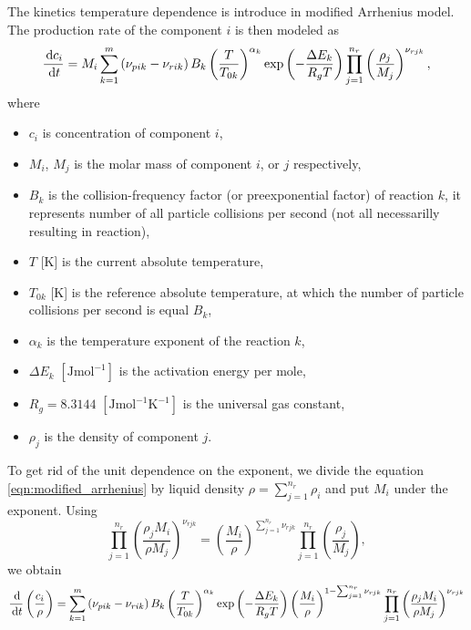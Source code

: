 The kinetics temperature dependence is introduce in modified Arrhenius model.
The production rate of the component $i$ is then modeled as
\begin{equation} \label{eqn:modified_arrhenius}
  \frac{\d c_i}{\d t} = M_i \sum\limits_{k=1}^{m}\left( \nu_{pik}-\nu_{rik} \right) 
  B_k \left(\frac{T}{T_{0k}}\right)^{\alpha_k} \exp\left(-\frac{\Delta E_k}{R_gT}\right)
  \prod\limits_{j=1}^{n_r}\left(\frac{\rho_j}{M_j}\right)^{\nu_{rjk}},
\end{equation}
where
\begin{itemize}
  \item $c_i$  is concentration of component $i$,
  \item $M_i$, $M_j$  is the molar mass of component $i$, or $j$ respectively,
  \item $B_k$  is the collision-frequency factor (or preexponential factor) of reaction $k$,
              it represents number of all particle collisions per second (not all necessarilly 
              resulting in reaction),
  \item $T$ [K] is the current absolute temperature,
  \item $T_{0k}$ [K] is the reference absolute temperature, at which the number of particle collisions per second
        is equal $B_k$,
  \item $\alpha_k$ \units{}{}{} is the temperature exponent of the reaction $k$,
  \item $\Delta E_k$ $[\textrm{Jmol}^{-1}]$ is the activation energy per mole,
  \item $R_g = 8.3144$ $[\textrm{Jmol}^{-1}\textrm{K}^{-1}]$ is the universal gas constant,
  \item $\rho_j$  is the density of component $j$.
\end{itemize}

To get rid of the unit dependence on the exponent, we divide the equation \eqref{eqn:modified_arrhenius} 
by liquid density $\rho=\sum_{j=1}^{n_r}\rho_i$ and put $M_i$ under the exponent. Using
\begin{equation}
  \prod\limits_{j=1}^{n_r}\left( \frac{\rho_j M_i}{\rho M_j}\right)^{\nu_{rjk}} 
  = \left(\frac{M_i}{\rho}\right)^{\sum_{j=1}^{n_r}\nu_{rjk}} 
    \prod\limits_{j=1}^{n_r}\left( \frac{\rho_j}{M_j}\right),
\end{equation}
we obtain
\begin{equation}
  \frac{\d}{\d t}\left(\frac{c_i}{\rho}\right) = \sum\limits_{k=1}^{m}\left( \nu_{pik}-\nu_{rik} \right) 
  B_k \left(\frac{T}{T_{0k}}\right)^{\alpha_k} \exp\left(-\frac{\Delta E_k}{R_gT}\right)
  \left(\frac{M_i}{\rho}\right)^{1-\sum_{j=1}^{n_r}\nu_{rjk}} 
  \prod\limits_{j=1}^{n_r}\left( \frac{\rho_j M_i}{\rho M_j}\right)^{\nu_{rjk}} 
%   
\end{equation}

